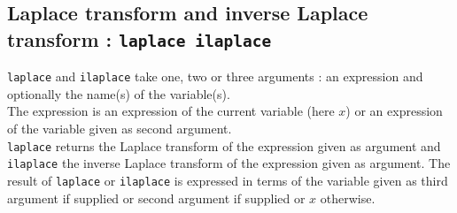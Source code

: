 \documentclass[a4paper,11pt]{book}
\begin{document}
\subsection{Laplace transform and inverse Laplace transform : {\tt laplace ilaplace}}\label{sec:lap}
{\tt laplace} and {\tt ilaplace} take one, two or three arguments :
 an expression and optionally the name(s) of the variable(s).\\
The expression is  an expression of the current variable (here $x$) or an 
expression of the variable given as second argument.\\
{\tt laplace} returns the Laplace transform of the expression given as argument
and {\tt ilaplace} the inverse Laplace transform of the expression given 
as argument. The result of {\tt laplace} or {\tt ilaplace} is expressed
in terms of the variable given as third argument if supplied
or second argument if supplied or $x$ otherwise.
\end{document}
